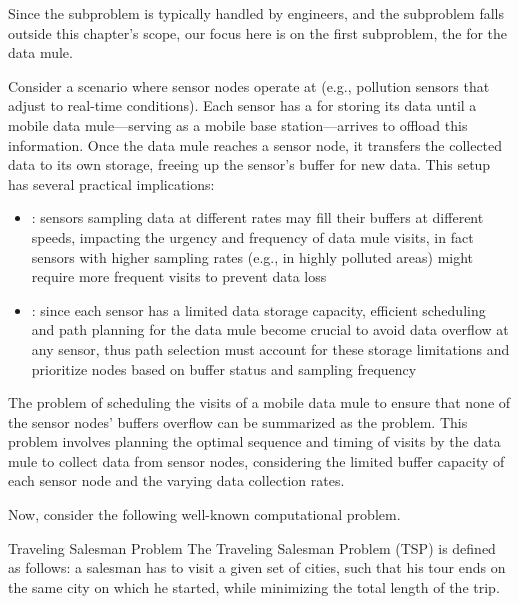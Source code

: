 \documentclass[a4paper, 12pt]{report}
\begin{document}
    Since the  subproblem is typically handled by engineers, and the  subproblem falls outside this chapter's scope, our focus here is on the first subproblem, the  for the data mule.

    Consider a scenario where sensor nodes operate at  (e.g., pollution sensors that adjust to real-time conditions). Each sensor has a  for storing its data until a mobile data mule—serving as a mobile base station—arrives to offload this information. Once the data mule reaches a sensor node, it transfers the collected data to its own storage, freeing up the sensor's buffer for new data. This setup has several practical implications:

    \begin{itemize}
        \item {}: sensors sampling data at different rates may fill their buffers at different speeds, impacting the urgency and frequency of data mule visits, in fact sensors with higher sampling rates (e.g., in highly polluted areas) might require more frequent visits to prevent data loss
        \item {}: since each sensor has a limited data storage capacity, efficient scheduling and path planning for the data mule become crucial to avoid data overflow at any sensor, thus path selection must account for these storage limitations and prioritize nodes based on buffer status and sampling frequency
    \end{itemize}

    The problem of scheduling the visits of a mobile data mule to ensure that none of the sensor nodes' buffers overflow can be summarized as the  problem. This problem involves planning the optimal sequence and timing of visits by the data mule to collect data from sensor nodes, considering the limited buffer capacity of each sensor node and the varying data collection rates.

    Now, consider the following well-known computational problem.

    \begin{frameddefn}{Traveling Salesman Problem}
        The Traveling Salesman Problem (TSP) is defined as follows: a salesman has to visit a given set of cities, such that his tour ends on the same city on which he started, while minimizing the total length of the trip.
    \end{frameddefn}
\end{document}
